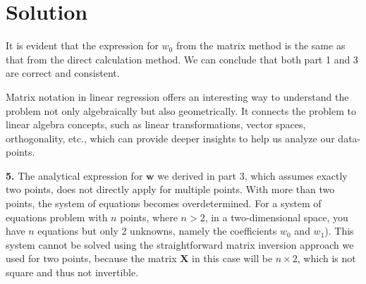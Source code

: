 \documentclass{harvardml}
\theoremstyle{definition}
\theoremstyle{plain}
\newenvironment{solution}
  {\color{blue}\section*{Solution}}
{}
\begin{document}
\begin{solution}
It is evident that the expression for \(w_0\) from the matrix method is the same as that from the direct calculation method.
We can conclude that both part 1 and 3 are correct and consistent. 

Matrix notation in linear regression offers an interesting way to understand the problem not only algebraically but also geometrically. It connects the problem to linear algebra concepts, such as linear transformations, vector spaces, orthogonality, etc., which can provide deeper insights to help us analyze our data-points.

\bigskip
\noindent \textbf{5.}
The analytical expression for \(\mathbf{w}\) we derived in part 3, which assumes exactly two points, does not directly apply for multiple points. With more than two points, the system of equations becomes overdetermined. For a system of equations problem with \(n\) points, where \(n > 2\), in a two-dimensional space, you have \(n\) equations but only 2 unknowns, namely the coefficients \(w_0\) and \(w_1\)). This system cannot be solved using the straightforward matrix inversion approach we used for two points, because the matrix \(\mathbf{X}\) in this case will be \(n \times 2\), which is not square and thus not invertible.
\end{solution}

\color{black}
\newpage
\end{document}
